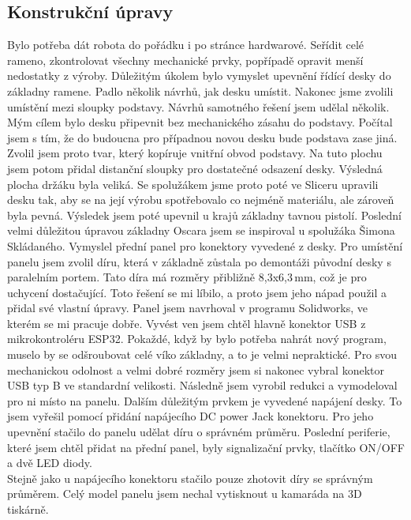 \subsection{Konstrukční úpravy}
Bylo potřeba dát robota do pořádku i po stránce hardwarové. Seřídit celé rameno, zkontrolovat všechny mechanické prvky, popřípadě opravit menší nedostatky z výroby. Důležitým úkolem bylo vymyslet upevnění řídící desky do základny ramene. Padlo několik návrhů, jak desku umístit. Nakonec jsme zvolili umístění mezi sloupky podstavy. Návrhů samotného řešení jsem udělal několik. Mým cílem bylo desku připevnit bez mechanického zásahu do podstavy. Počítal jsem s tím, že do budoucna pro případnou novou desku bude podstava zase jiná. Zvolil jsem proto tvar, který kopíruje vnitřní obvod podstavy. Na tuto plochu jsem potom přidal distanční sloupky pro dostatečné odsazení desky. Výsledná plocha držáku byla veliká. Se spo\-lu\-žá\-kem jsme proto poté ve Sliceru upravili desku tak, aby se na její výrobu spotřebovalo co nejméně materiálu, ale zároveň byla pevná. Výsledek jsem poté upevnil u krajů základny tavnou pistolí. Poslední velmi důležitou úpravou základny Oscara jsem se inspiroval u spolužáka Šimona Skládaného. Vymyslel přední panel pro konektory vyvedené z desky. Pro umístění panelu jsem zvolil díru, která v základně zůstala po demontáži původní desky s paralelním portem. Tato díra má rozměry přibližně 8,3x6,3\,mm, což je pro uchycení dostačující. Toto řešení se mi líbilo, a proto jsem jeho nápad použil a přidal své vlastní úpravy. Panel jsem navrhoval v programu Solidworks, ve kterém se mi pracuje dobře. Vyvést ven jsem chtěl hlavně konektor USB z mikrokontroléru ESP32. Pokaždé, když by bylo potřeba nahrát nový program, muselo by se odšroubovat celé víko základny, a to je velmi nepraktické. Pro svou mechanickou odolnost a velmi dobré rozměry jsem si nakonec vybral konektor USB typ B ve standardní velikosti. Následně jsem vyrobil redukci a vymodeloval pro ni místo na panelu. Dalším důležitým prvkem je vyvedené napájení desky. To jsem vyřešil pomocí přidání napájecího DC power Jack konektoru. Pro jeho upevnění stačilo do panelu udělat díru o správném průměru. Poslední periferie, které jsem chtěl přidat na přední panel, byly signalizační prvky, tlačítko ON/OFF a dvě LED diody.\\ Stejně jako u napájecího konektoru stačilo pouze zhotovit díry se správným průměrem. Celý model panelu jsem nechal vytisknout u kamaráda na 3D tiskárně.

